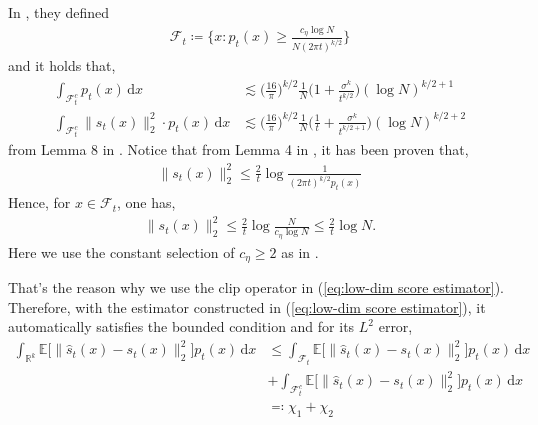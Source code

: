 \documentclass{article}
\newcommand{\defn}{\coloneqq}
\newcommand{\defnrev}{\eqqcolon}
\newcommand{\diff}{\,\mathrm{d}}
\theoremstyle{plain}
\theoremstyle{remark}
\begin{document}
In \citet{cai2025minimaxoptimalityprobabilityflow}, they defined
\begin{align*}
    \mathcal{F}_t \defn \Big\{ x: p_t(x)\geq \frac{c_{\eta} \log N}{N(2\pi t)^{k/2}}\Big\}
\end{align*}
and it holds that, 
\begin{subequations}
    \begin{align}
    \int_{\mathcal{F}_t^c}  p_t(x) \diff x &\lesssim \Big( \frac{16}{\pi}\Big)^{k/2} \frac{1}{N} \Big( 1 + \frac{\sigma^k }{ t^{k/2}}\Big) (\log N)^{k/2+1} \label{eq:prob bdd on F_t^c} \\
    \int_{\mathcal{F}_t^c} \|s_t(x)\|_2^2\cdot  p_t(x) \diff x &\lesssim \Big( \frac{16}{\pi}\Big)^{k/2} \frac{1}{N} \Big( \frac{1}{t} + \frac{\sigma^k }{ t^{k/2+1}}\Big) (\log N)^{k/2+2} \label{eq:score bdd on F_t^c}
\end{align}
\end{subequations}
from Lemma 8 in \citet{cai2025minimaxoptimalityprobabilityflow}.
Notice that from Lemma 4 in \citet{cai2025minimaxoptimalityprobabilityflow}, it has been proven that, 
\begin{align*}
    \| s_t(x)\|_2^2 \leq \frac{2}{t} \log \frac{1}{(2\pi t)^{k/2} p_t(x)} 
\end{align*}
Hence, for $x\in \mathcal{F}_t$, one has, 
\begin{align}
    \| s_t(x)\|_2^2 \leq \frac{2}{t} \log \frac{N}{c_{\eta} \log N} \leq \frac{2}{t} \log N . \label{eq:score bdd on F_t}
\end{align}
Here we use the constant selection of $c_{\eta} \geq 2$ as in \citet{cai2025minimaxoptimalityprobabilityflow}. 

That's the reason why we use the clip operator in (\ref{eq:low-dim score estimator}). Therefore, with the estimator constructed in (\ref{eq:low-dim score estimator}), it automatically satisfies the bounded condition and for its $L^2$ error, 
\begin{align*}
    \int_{\mathbb{R}^k} \mathbb{E}\big[\big\| \widehat{s}_t(x) - s_t(x)\big\|_2^2 \big] p_t(x) \diff x&\leq \int_{\mathcal{F}_t} \mathbb{E}\big[\big\| \widehat{s}_t(x) - s_t(x)\big\|_2^2 \big] p_t(x) \diff x \\
    &+ \int_{\mathcal{F}_t^c} \mathbb{E}\big[\big\| \widehat{s}_t(x) - s_t(x)\big\|_2^2 \big] p_t(x) \diff x \\
    &\defnrev \chi_1 + \chi_2
\end{align*}
\end{document}
